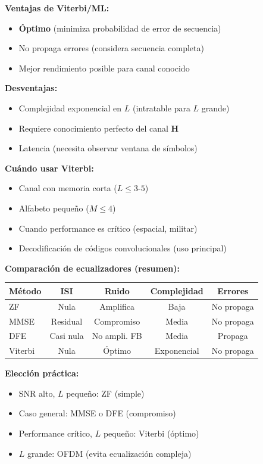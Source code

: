 \documentclass[10pt,a4paper]{article}
\begin{document}
\textbf{Ventajas de Viterbi/ML:}
\begin{itemize}
\item \textbf{Óptimo} (minimiza probabilidad de error de secuencia)
\item No propaga errores (considera secuencia completa)
\item Mejor rendimiento posible para canal conocido
\end{itemize}

\textbf{Desventajas:}
\begin{itemize}
\item Complejidad exponencial en $L$ (intratable para $L$ grande)
\item Requiere conocimiento perfecto del canal $\mathbf{H}$
\item Latencia (necesita observar ventana de símbolos)
\end{itemize}

\textbf{Cuándo usar Viterbi:}
\begin{itemize}
\item Canal con memoria corta ($L \leq 3$-$5$)
\item Alfabeto pequeño ($M \leq 4$)
\item Cuando performance es crítico (espacial, militar)
\item Decodificación de códigos convolucionales (uso principal)
\end{itemize}

\textbf{Comparación de ecualizadores (resumen):}

\begin{center}
\begin{tabular}{|l|c|c|c|c|}
\hline
\textbf{Método} & \textbf{ISI} & \textbf{Ruido} & \textbf{Complejidad} & \textbf{Errores} \\
\hline
ZF & Nula & Amplifica & Baja & No propaga \\
MMSE & Residual & Compromiso & Media & No propaga \\
DFE & Casi nula & No ampli. FB & Media & Propaga \\
Viterbi & Nula & Óptimo & Exponencial & No propaga \\
\hline
\end{tabular}
\end{center}

\textbf{Elección práctica:}
\begin{itemize}
\item SNR alto, $L$ pequeño: ZF (simple)
\item Caso general: MMSE o DFE (compromiso)
\item Performance crítico, $L$ pequeño: Viterbi (óptimo)
\item $L$ grande: OFDM (evita ecualización compleja)
\end{itemize}
\end{document}
